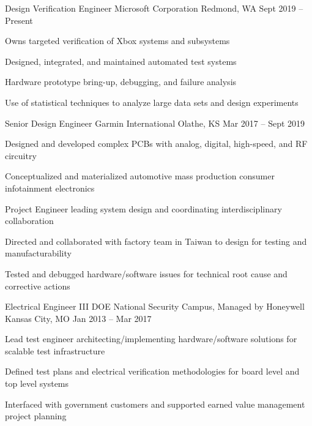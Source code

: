 \documentclass[]{awesome-cv}
\begin{document}
\vspace{-2mm}
\begin{cventries}
	\cventry
	{Design Verification Engineer}
	{Microsoft Corporation}
	{Redmond, WA}
	{Sept 2019 – Present}
	{\begin{cvitems}
		\item {Owns targeted verification of Xbox systems and subsystems}
		\item {Designed, integrated, and maintained automated test systems}
		\item {Hardware prototype bring-up, debugging, and failure analysis}
		\item {Use of statistical techniques to analyze large data sets and design experiments}
	\end{cvitems}}
	\cventry
	{Senior Design Engineer}
	{Garmin International}
	{Olathe, KS}
	{Mar 2017 – Sept 2019}
	{\begin{cvitems}
		\item {Designed and developed complex PCBs with analog, digital, high-speed, and RF circuitry}
		\item {Conceptualized and materialized automotive mass production consumer infotainment electronics}
		\item {Project Engineer leading system design and coordinating interdisciplinary collaboration}
		\item {Directed and collaborated with factory team in Taiwan to design for testing and manufacturability}
		\item {Tested and debugged hardware/software issues for technical root cause and corrective actions}
		\end{cvitems}}
	\cventry
	{Electrical Engineer III}
	{DOE National Security Campus, Managed by Honeywell}
	{Kansas City, MO}
	{Jan 2013 – Mar 2017}
	{\begin{cvitems}
		\item {Lead test engineer architecting/implementing hardware/software solutions for scalable test infrastructure}
		\item {Defined test plans and electrical verification methodologies for board level and top level systems}
		\item {Interfaced with government customers and supported earned value management project planning}
		\end{cvitems}}

\end{cventries}
\end{document}
